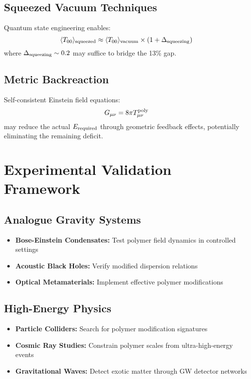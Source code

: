 \documentclass[11pt]{article}
\begin{document}
\subsection{Squeezed Vacuum Techniques}
Quantum state engineering enables:
\[
  \langle T_{00} \rangle_{\rm squeezed} \approx \langle T_{00} \rangle_{\rm vacuum} \times (1 + \Delta_{\rm squeezing})
\]
where $\Delta_{\rm squeezing} \sim 0.2$ may suffice to bridge the 13\% gap.

\subsection{Metric Backreaction}
Self-consistent Einstein field equations:
\[
  G_{\mu\nu} = 8\pi T_{\mu\nu}^{\rm poly}
\]
may reduce the actual $E_{\rm required}$ through geometric feedback effects, potentially eliminating the remaining deficit.

\section{Experimental Validation Framework}

\subsection{Analogue Gravity Systems}
\begin{itemize}
  \item \textbf{Bose-Einstein Condensates:} Test polymer field dynamics in controlled settings
  \item \textbf{Acoustic Black Holes:} Verify modified dispersion relations
  \item \textbf{Optical Metamaterials:} Implement effective polymer modifications
\end{itemize}

\subsection{High-Energy Physics}
\begin{itemize}
  \item \textbf{Particle Colliders:} Search for polymer modification signatures
  \item \textbf{Cosmic Ray Studies:} Constrain polymer scales from ultra-high-energy events
  \item \textbf{Gravitational Waves:} Detect exotic matter through GW detector networks
\end{itemize}
\end{document}
